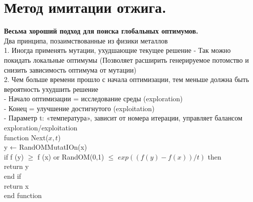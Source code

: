 \newcommand\tab[1][1cm]{\hspace*{#1}}
\section{Метод имитации отжига.}
\textbf{Весьма хороший подход для поиска глобальных оптимумов.}\\
Два принципа, позаимствованные из физики металлов \\
1. Иногда применять мутации, ухудшающие текущее решение
- Так можно покидать локальные оптимумы (Позволяет расширить генерируемое потомство и снизить зависимость оптимума от мутации)\\
2. Чем больше времени прошло с начала оптимизации, тем меньше должна быть вероятность ухудшить решение \\
- Начало оптимизации = исследование среды (exploration) \\
- Конец = улучшение достигнутого (exploitation) \\
- Параметр t: «температура», зависит от номера итерации, управляет балансом exploration/exploitation \\

function Next($x,t$)  \\
\tab y ← RandOMMutatIOn(x)  \\ 
\tab if f (y) $\ge$ f (x) or RandOM(0,1) $\le$ $exp((f (y)-f (x))/t)$ then \\ 
\tab \tab return y  \\
\tab end if  \\
\tab return x  \\
end function \\
